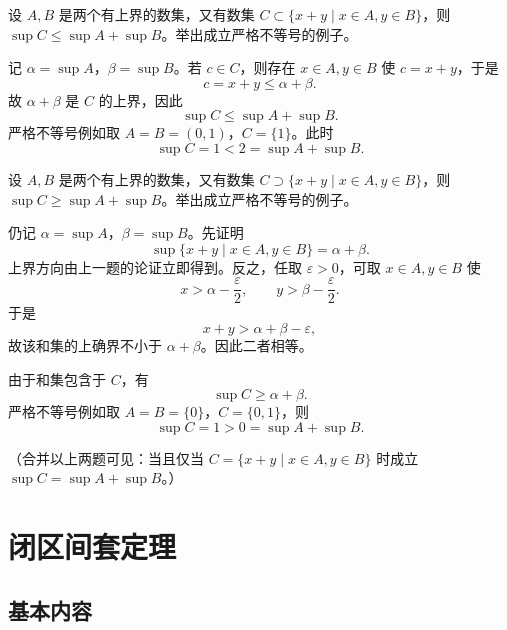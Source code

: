 \begin{xexercise}[8]
设 $A,B$ 是两个有上界的数集，又有数集 $C\subset\{x+y\mid x\in A,y\in B\}$，则 $\sup C\leqslant\sup A+\sup B$。举出成立严格不等号的例子。
\end{xexercise}
\begin{xsolution}
记 $\alpha=\sup A$，$\beta=\sup B$。若 $c\in C$，则存在 $x\in A,y\in B$ 使 $c=x+y$，于是
\[
  c=x+y\leqslant\alpha+\beta.
\]
故 $\alpha+\beta$ 是 $C$ 的上界，因此
\[
  \sup C\leqslant\sup A+\sup B.
\]
严格不等号例如取 $A=B=(0,1)$，$C=\{1\}$。此时
\[
  \sup C=1<2=\sup A+\sup B.
\]
\end{xsolution}


\begin{xexercise}[9]
设 $A,B$ 是两个有上界的数集，又有数集 $C\supset\{x+y\mid x\in A,y\in B\}$，则 $\sup C\geqslant\sup A+\sup B$。举出成立严格不等号的例子。
\end{xexercise}
\begin{xsolution}
仍记 $\alpha=\sup A$，$\beta=\sup B$。先证明
\[
  \sup\{x+y\mid x\in A,y\in B\}=\alpha+\beta.
\]
上界方向由上一题的论证立即得到。反之，任取 $\varepsilon>0$，可取 $x\in A,y\in B$ 使
\[
  x>\alpha-\frac\varepsilon2,
  \qquad
  y>\beta-\frac\varepsilon2.
\]
于是
\[
  x+y>\alpha+\beta-\varepsilon,
\]
故该和集的上确界不小于 $\alpha+\beta$。因此二者相等。

由于和集包含于 $C$，有
\[
  \sup C\geqslant\alpha+\beta.
\]
严格不等号例如取 $A=B=\{0\}$，$C=\{0,1\}$，则
\[
  \sup C=1>0=\sup A+\sup B.
\]
\end{xsolution}


（合并以上两题可见：当且仅当 $C=\{x+y\mid x\in A,y\in B\}$ 时成立 $\sup C=\sup A+\sup B$。）

\section{闭区间套定理}

\subsection{基本内容}

